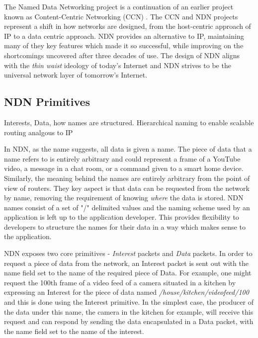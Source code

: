 The Named Data Networking project is a continuation of an earlier project known as Content-Centric Networking (CCN) \cite{vj-named-content}. The CCN and NDN projects represent a shift in how networks are designed, from the host-centric approach of IP to a data centric approach. NDN provides an alternative to IP, maintaining many of they key features which made it so successful, while improving on the shortcomings uncovered after three decades of use. The design of NDN aligns with the \textit{thin waist} ideology of today's Internet and NDN strives to be the universal network layer of tomorrow's Internet. 



\subsection{NDN Primitives}
Interests, Data, how names are structured. Hierarchical naming to enable scalable routing analgous to IP

In NDN, as the name suggests, all data is given a name. The piece of data that a name refers to is entirely arbitrary and could represent a frame of a YouTube video, a message in a chat room, or a command given to a smart home device. Similarly, the meaning behind the names are entirely arbitrary from the point of view of routers. They key aspect is that data can be requested from the network by name, removing the requirement of knowing \textit{where} the data is stored. NDN names consist of a set of "/" delimited values and the naming scheme used by an application is left up to the application developer. This provides flexibility to developers to structure the names for their data in a way which makes sense to the application.

NDN exposes two core primitives - \textit{Interest} packets and \textit{Data} packets. In order to request a piece of data from the network, an Interest packet is sent out with the name field set to the name of the required piece of Data. For example, one might request the 100th frame of a video feed of a camera situated in a kitchen by expressing an Interest for the piece of data named \textit{/house/kitchen/videofeed/100} and this is done using the Interest primitive. In the simplest case, the producer of the data under this name, the camera in the kitchen for example, will receive this request and can respond by sending the data encapsulated in a Data packet, with the name field set to the name of the interest.

